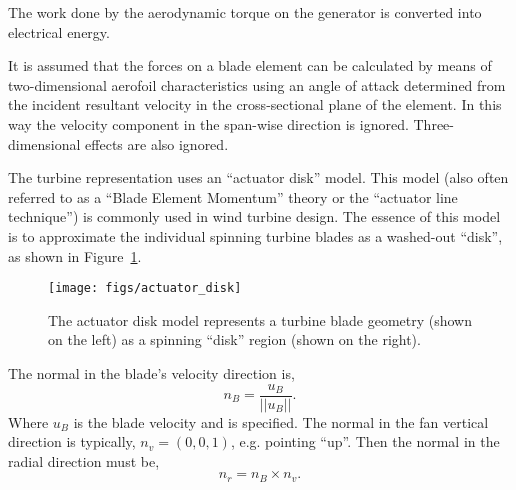 The work done by the aerodynamic torque on the
generator is converted into electrical energy.

It is assumed that the forces on a blade element can be calculated by
means of two-dimensional aerofoil characteristics using an angle of
attack determined from the incident resultant velocity in the
cross-sectional plane of the element. In this way the velocity component
in the span-wise direction is ignored. Three-dimensional effects are
also ignored\cite{burton2001wind}. 

The turbine representation uses an ``actuator disk'' model. This model
(also often referred to as a ``Blade Element Momentum'' theory or the
``actuator line technique'') is commonly used in wind turbine
design\cite{shevell1983fundamentals,betz,leclerc}. The essence of this
model is to approximate the individual spinning turbine blades as a
washed-out ``disk'', as shown in Figure~\ref{fig:actuator_disk}.  

   \begin{figure}[!htb]
    \centering
    \texttt{[image: figs/actuator\_disk]}
     \caption{The actuator disk model represents a turbine blade
    geometry (shown on the left) as a spinning ``disk'' region (shown
    on the right).}
     \label{fig:actuator_disk}
   \end{figure}

The normal in the blade's velocity direction is,
\begin{equation*}
n_B = \frac{u_B}{||u_B||}. 
\end{equation*}
Where $u_B$ is the blade velocity and is specified. The normal in the
fan vertical direction is typically, $n_v = \left(0,0,1\right)$, 
e.g. pointing ``up''. Then the normal in the radial direction must be, 
\begin{equation*}
n_r = n_B \times n_v. 
\end{equation*}



